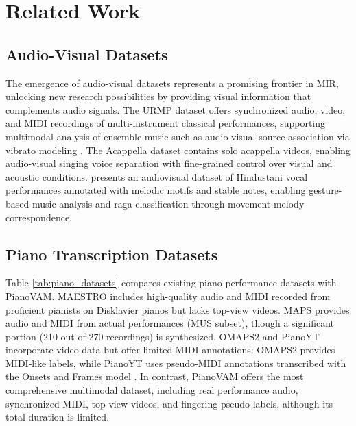 \documentclass{article}
\begin{document}
\section{Related Work}
\subsection{Audio-Visual Datasets}
The emergence of audio-visual datasets represents a promising frontier in MIR, unlocking new research possibilities by providing visual information that complements audio signals. The URMP dataset \cite{TMM18Li} offers synchronized audio, video, and MIDI recordings of multi-instrument classical performances, supporting multimodal analysis of ensemble music such as audio-visual source association via vibrato modeling \cite{SMC17Li}. The Acappella dataset \cite{BMVC21Montesinos} contains solo acappella videos, enabling audio-visual singing voice separation with fine-grained control over visual and acoustic conditions. \cite{TISMIR24Nadkarni} presents an audiovisual dataset of Hindustani vocal performances annotated with melodic motifs and stable notes, enabling gesture-based music analysis and raga classification through movement-melody correspondence.

\subsection{Piano Transcription Datasets}
Table \ref{tab:piano_datasets} compares existing piano performance datasets with PianoVAM. MAESTRO \cite{ICLR19Hawthorne} includes high-quality audio and MIDI recorded from proficient pianists on Disklavier pianos but lacks top-view videos. MAPS \cite{Emiya2010} provides audio and MIDI from actual performances (MUS subset), though a significant portion (210 out of 270 recordings) is synthesized. OMAPS2 \cite{ICASSPW23Li} and PianoYT \cite{ICASSP20Koepke} incorporate video data but offer limited MIDI annotations: OMAPS2 provides MIDI-like labels, while PianoYT uses pseudo-MIDI annotations transcribed with the Onsets and Frames model \cite{ISMIR18Hawthorne}. In contrast, PianoVAM offers the most comprehensive multimodal dataset, including real performance audio, synchronized MIDI, top-view videos, and fingering pseudo-labels, although its total duration is limited.
\end{document}
